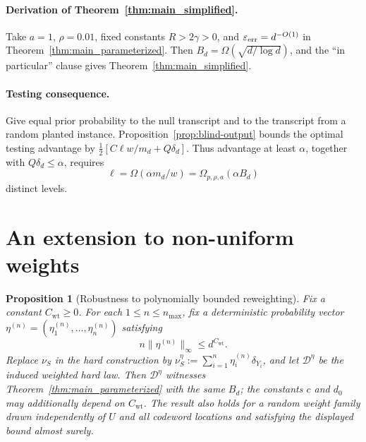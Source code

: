\documentclass[11pt,letterpaper]{article}
\newtheorem{proposition}[theorem]{Proposition}
\newcommand{\1}{\mathbbm{1}}
\begin{document}
\paragraph{Derivation of Theorem~\ref{thm:main_simplified}.}
Take \(a=1\), \(\rho=0.01\), fixed constants \(R>2\gamma>0\), and
\(\varepsilon_{\rm err}=d^{-O(1)}\) in
Theorem~\ref{thm:main_parameterized}.  Then
\(B_d=\Omega(\sqrt{d/\log d})\), and the ``in particular'' clause
gives Theorem~\ref{thm:main_simplified}.

\paragraph{Testing consequence.}
Give equal prior probability to the null transcript and to the
transcript from a random planted instance.  Proposition~\ref{prop:blind-output}
bounds the optimal testing advantage by
\(\tfrac12[C\ell w/m_d+Q\delta_d]\).  Thus advantage at
least \(\alpha\), together with \(Q\delta_d\le\alpha\), requires
\[
   \ell=\Omega(\alpha m_d/w)
   =\Omega_{p,\rho,a}(\alpha B_d)
\]
distinct levels.

\section{An extension to non-uniform weights}
\label{sec:nonuniform-weights}

\begin{proposition}[Robustness to polynomially bounded reweighting]
\label{prop:bounded-reweighting}
Fix a constant \(C_{\mathrm{wt}}\ge0\).  For each
\(1\le n\le n_{\max}\), fix a deterministic probability vector
\(\eta^{(n)}=(\eta^{(n)}_1,\ldots,\eta^{(n)}_n)\) satisfying
\[
   n\|\eta^{(n)}\|_\infty\le d^{C_{\mathrm{wt}}}.
\]
Replace \(\nu_S\) in the hard construction by
\(\nu^\eta_S:=\sum_{i=1}^n\eta^{(n)}_i\delta_{Y_i}\), and let
\(\mathcal D^\eta\) be the induced weighted hard law.  Then
\(\mathcal D^\eta\) witnesses Theorem~\ref{thm:main_parameterized}
with the same \(B_d\); the constants \(c\) and \(d_0\) may additionally
depend on \(C_{\mathrm{wt}}\).  The result also holds for a random
weight family drawn independently of \(U\) and all codeword locations
and satisfying the
displayed bound almost surely.
\end{proposition}
\end{document}
